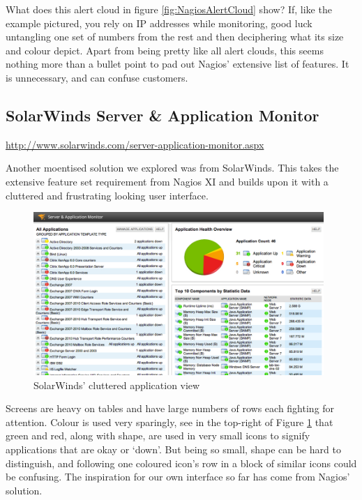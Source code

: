 \documentclass{l3proj}
\begin{document}
What does this alert cloud in figure \ref{fig:NagiosAlertCloud} show? If, like the example pictured, you rely on IP addresses while monitoring, good luck untangling one set of numbers from the rest and then deciphering what its size and colour depict. Apart from being pretty like all alert clouds, this seems nothing more than a bullet point to pad out Nagios' extensive list of features.  It is unnecessary, and can confuse customers.

\subsection{SolarWinds Server \& Application Monitor}

\url{http://www.solarwinds.com/server-application-monitor.aspx}

Another moentised solution we explored was from SolarWinds. This takes the extensive feature set requirement from Nagios XI and builds upon it with a cluttered and frustrating looking user interface.

\begin{figure}[H]
\centering
\includegraphics[width=110mm]{Competitors/SolarWinds_AppView.jpg}
\caption{SolarWinds' cluttered application view}
\label{fig:SWAppView}
\end{figure}

Screens are heavy on tables and have large numbers of rows each fighting for attention. Colour is used very sparingly, see in the top-right of Figure \ref{fig:SWAppView} that green and red, along with shape, are used in very small icons to signify applications that are okay or `down'. But being so small, shape can be hard to distinguish, and following one coloured icon's row in a block of similar icons could be confusing. The inspiration for our own interface so far has come from Nagios' solution.
\end{document}
